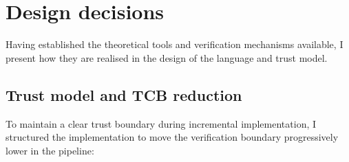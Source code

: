 \section{Design decisions}\label{sec:design-decisions}

Having established the theoretical tools and verification mechanisms available, I present how they are realised in the design of the language and trust model.

%
%
%

\subsection{Trust model and TCB reduction}

To maintain a clear trust boundary during incremental implementation, I structured the implementation to move the verification boundary progressively lower in the pipeline:

